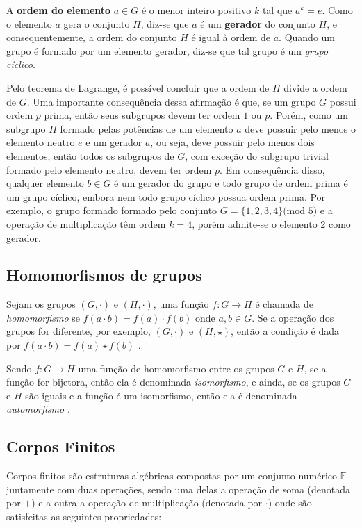 A \textbf{ordem do elemento} $a \in G$ é o menor inteiro positivo $k$ tal que $a^k = e$. Como o elemento $a$ gera o conjunto $H$, diz-se que $a$ é um \textbf{gerador} do conjunto $H$, e consequentemente, a ordem do conjunto $H$ é igual à ordem de $a$. Quando um grupo é formado por um elemento gerador, diz-se que tal grupo é um \textit{grupo cíclico}. \cite{Coutinho:2014}

Pelo teorema de Lagrange, é possível concluir que a ordem de $H$ divide a ordem de $G$. Uma importante consequência dessa afirmação é que, se um grupo $G$ possui ordem $p$ prima, então seus subgrupos devem ter ordem $1$ ou $p$. Porém, como um subgrupo $H$ formado pelas potências de um elemento $a$ deve possuir pelo menos o elemento neutro $e$ e um gerador $a$, ou seja, deve possuir pelo menos dois elementos, então todos os subgrupos de $G$, com exceção do subgrupo trivial formado pelo elemento neutro, devem ter ordem $p$. Em consequência disso, qualquer elemento $b \in G$ é um gerador do grupo e todo grupo de ordem prima é um grupo cíclico, embora nem todo grupo cíclico possua ordem prima. Por exemplo, o grupo formado formado pelo conjunto $G=\{1,2,3,4\} \mbox{(mod 5)}$ e a operação de multiplicação têm ordem $k = 4$, porém admite-se o elemento 2 como gerador. \cite{Coutinho:2014}

%
%
\subsection{Homomorfismos de grupos}
Sejam os grupos $(G, \cdot)$ e $(H, \cdot)$, uma função $f: G \rightarrow H$ é chamada de \textit{homomorfismo} se $f(a \cdot b) = f(a) \cdot f(b)$ onde $a, b \in G$. Se a operação dos grupos for diferente, por exemplo, $(G, \cdot)$ e $(H, \star)$, então a condição é dada por $f(a \cdot b) = f(a) \star f(b)$ \cite{Gilbert:2004}.

Sendo $f: G \rightarrow H$ uma função de homomorfismo entre os grupos \(G\) e \(H\), se a função for bijetora, então ela é denominada \textit{isomorfismo}, e ainda, se os grupos \(G\) e \(H\) são iguais e a função é um isomorfismo, então ela é denominada \textit{automorfismo} \cite{Shokranian:2010}.

%
%
\subsection{Corpos Finitos}
Corpos finitos são estruturas algébricas compostas por um conjunto numérico \(\mathbb{F}\) juntamente com duas operações, sendo uma delas a operação de soma (denotada por $+$) e a outra a operação de multiplicação (denotada por $\cdot$) onde são satisfeitas as seguintes propriedades: \cite{Guide}

